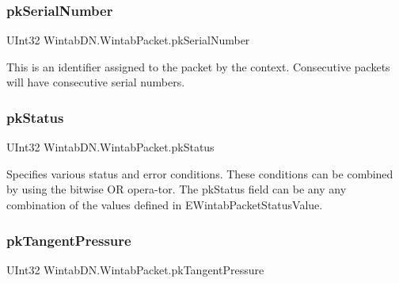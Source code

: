 \mbox{\label{struct_wintab_d_n_1_1_wintab_packet_acf152814269e76ecb7e957d9b46c2b68}} 
\subsubsection{\texorpdfstring{pk\+Serial\+Number}{pkSerialNumber}}
{\footnotesize\ttfamily U\+Int32 Wintab\+D\+N.\+Wintab\+Packet.\+pk\+Serial\+Number}



This is an identifier assigned to the packet by the context. Consecutive packets will have consecutive serial numbers. 

\mbox{\label{struct_wintab_d_n_1_1_wintab_packet_acab466b784a0d38759f246940f7faccd}} 
\subsubsection{\texorpdfstring{pk\+Status}{pkStatus}}
{\footnotesize\ttfamily U\+Int32 Wintab\+D\+N.\+Wintab\+Packet.\+pk\+Status}



Specifies various status and error conditions. These conditions can be combined by using the bitwise OR opera-\/tor. The pk\+Status field can be any any combination of the values defined in E\+Wintab\+Packet\+Status\+Value. 

\mbox{\label{struct_wintab_d_n_1_1_wintab_packet_a32641d97db6e9dcd0fced24782e522af}} 
\subsubsection{\texorpdfstring{pk\+Tangent\+Pressure}{pkTangentPressure}}
{\footnotesize\ttfamily U\+Int32 Wintab\+D\+N.\+Wintab\+Packet.\+pk\+Tangent\+Pressure}



